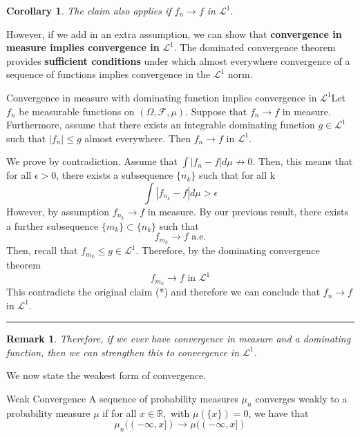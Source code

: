 \documentclass[twoside]{article}
\newtheorem{corollary}[theorem]{Corollary}
\newtheorem{remark}[theorem]{Remark}
\newenvironment{proof}{{\bf Proof:}}{\hfill\rule{2mm}{2mm}}
\begin{document}
\begin{corollary} The claim also applies if $f_n \rightarrow f$ in $\mathcal{L}^1.$
\end{corollary}

However, if we add in an extra assumption, we can show that \textbf{convergence in measure implies convergence in} $\mathcal{L}^1.$ The dominated convergence theorem provides \textbf{sufficient conditions} under which almost everywhere convergence of a sequence of functions implies convergence in the $\mathcal{L}^1$ norm.

\begin{proposition_exam}{Convergence in measure with dominating function implies convergence in $\mathcal{L}^1$}{}Let $f_n$ be measurable functions on $(\Omega, \mathcal{F}, \mu)$. Suppose that $f_n \rightarrow f$ in measure. Furthermore, assume that there exists an integrable dominating function $g \in \mathcal{L}^1$ such that $|f_n| \leq g$ almost everywhere. Then $f_n \rightarrow f$ in $\mathcal{L}^1.$
\end{proposition_exam}

\begin{proof} We prove by contradiction. Assume that $\int |f_n - f|d\mu \not \rightarrow 0.$ Then, this means that for all $\epsilon > 0$, there exists a subsequence $\{n_k\}$ such that for all k 
\begin{equation}
\int |f_{n_{k}} - f|d\mu > \epsilon
\tag{*}
\end{equation}
However, by assumption $f_{n_{k}} \rightarrow f$ in measure. By our previous result, there exists a further subsequence $\{m_k\} \subset \{n_k\}$ such that 
$$
f_{m_{k}} \rightarrow f \text{ a.e.}
$$
Then, recall that $f_{m_{k}} \leq g \in \mathcal{L}^1$. Therefore, by the dominating convergence theorem 
$$
f_{m_{k}} \rightarrow f \text{ in } \mathcal{L}^1
$$
This contradicts the original claim (*) and therefore we can conclude that $f_n \rightarrow f$ in $\mathcal{L}^1.$
\end{proof}

\begin{remark} Therefore, if we ever have convergence in measure and a dominating function, then we can strengthen this to convergence in $\mathcal{L}^1.$
\end{remark}


We now state the weakest form of convergence.

\begin{definition_exam}{Weak Convergence}{} A sequence of probability measures $\mu_n$ converges weakly to a probability measure $\mu$ if for all $x \in \mathbb{R},$ with $\mu(\{x\}) = 0$, we have that 
$$
\mu_n((-\infty, x]) \rightarrow \mu((-\infty, x])
$$
\end{definition_exam}
\end{document}
